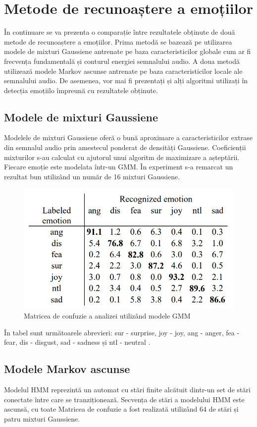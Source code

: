 \documentclass[9pt,shortpaper,twoside,web]{ieeecolor}
\begin{document}
\section{Metode de recunoaștere a emoțiilor}
În continuare se va prezenta o comparație între rezultatele obținute de două metode de recunoaștere a emoțiilor. Prima metodă se bazează pe utilizarea modele de mixturi Gaussiene antrenate pe baza caracteristicilor globale cum ar fi frecvența fundamentală și conturul energiei semnalului audio. A doua metodă utilizează modele Markov ascunse antrenate pe baza caracteristicilor locale ale semnalului audio. 
De asemenea, vor mai fi prezentați și alți algoritmi utilizați în detecția emoțiilo împreună cu rezultatele obținute.
\subsection{Modele de mixturi Gaussiene}
Modelele de mixturi Gaussiene oferă o bună aproximare a caracteristicilor extrase din semnalul audio prin amestecul ponderat de densități Gaussiene. Coeficienții mixturilor s-au calculat cu ajutorul unui algoritm de maximizare a așteptării. Fiecare emoție este modelata într-un GMM. În experiment s-a remarcat un rezultat bun utilizând un număr de 16 mixturi Gaussiene.

\begin{figure}[htb]
\includegraphics[width=0.8\columnwidth]{res/fig/GMM}
\caption{Matricea de confuzie a analizei utilizând modele GMM \cite{b8}}
\label{fig4}
\end{figure}

 În tabel sunt următoarele abrevieri: sur - surprise, joy - joy, ang - anger, fea - fear, dis - disgust, sad - sadness și ntl - neutral \cite{b8}.



\subsection{Modele Markov ascunse}
Modelul HMM reprezintă un automat cu stări finite alcătuit dintr-un set de stări conectate între care se tranziționează. Secvența de stări a modelului HMM este ascunsă, cu toate
Matricea de confuzie a fost realizată utilizând 64 de stări și patru mixturi Gaussiene. 
\end{document}
